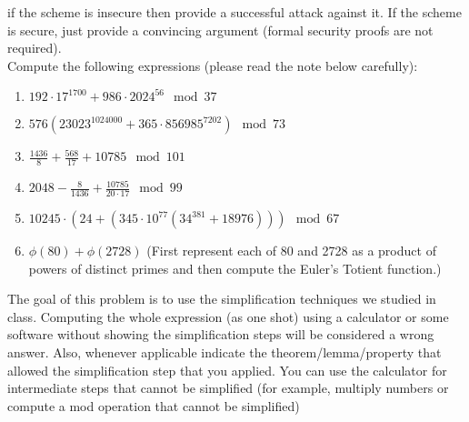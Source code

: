 \documentclass[12pt]{article}
\begin{document}
 if the scheme is insecure then provide a successful attack against it. If the scheme is secure, just provide a convincing argument (formal security proofs are not required). \\

Compute the following expressions (please read the note below carefully):
\begin{enumerate}
    \item $192 \cdot 17^{1700} + 986 \cdot 2024^{56} \mod 37$
    \item $576( 23023^{1024000} + 365 \cdot 856985^{7202}) \mod 73$
    
    \item $\frac{1436}{8} + \frac{568}{17} + 10785 \mod 101$
    
    \item $2048 - \frac{8}{1436} + \frac{10785}{20 \cdot 17} \mod 99$
    
    \item $10245 \cdot (24 + (345 \cdot 10^{77} (34^{381} + 18976))) \mod 67$
    
    \item $\phi(80) + \phi(2728)$ (First represent each of 80 and 2728 as a product of powers of distinct primes and then compute the Euler's Totient function.)
\end{enumerate}


 The goal of this problem is to use the simplification techniques we studied in class. Computing the whole expression (as one shot) using a calculator or some software without showing the simplification steps will be considered a wrong answer. Also, whenever applicable indicate the theorem/lemma/property that allowed the simplification step that you applied. You can use the calculator for intermediate steps that cannot be simplified (for example, multiply numbers or compute a mod operation that cannot be simplified) \\
\end{document}
